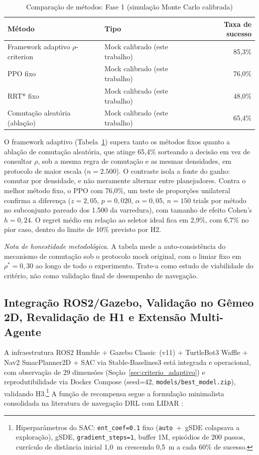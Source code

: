 \documentclass[12pt, a4paper]{article}
\begin{document}
\begin{table}[H]
  \centering
  \caption{Comparação de métodos: Fase 1 (simulação Monte Carlo calibrada)}
  \label{tab:fase1}
  \begin{tabular}{llr}
    \toprule
    \textbf{Método} & \textbf{Tipo} & \textbf{Taxa de sucesso} \\
    \midrule
    Framework adaptivo $\rho$-criterion & Mock calibrado (este trabalho) & 85,3\% \\
    PPO fixo                            & Mock calibrado (este trabalho) & 76,0\% \\
    RRT* fixo                           & Mock calibrado (este trabalho) & 48,0\% \\
    Comutação aleatória (ablação)       & Mock calibrado (este trabalho) & 65,4\% \\
    \bottomrule
  \end{tabular}
\end{table}

O framework adaptivo (Tabela~\ref{tab:fase1}) supera tanto os métodos fixos quanto a ablação de
comutação aleatória, que atinge 65,4\% sorteando a decisão em vez de consultar $\rho$, sob a
mesma regra de comutação e as mesmas densidades, em protocolo de maior escala ($n{=}2.500$). O
contraste isola a fonte do ganho: comutar por densidade, e não meramente alternar entre
planejadores. Contra o melhor método fixo, o PPO com 76,0\%, um teste de proporções unilateral
confirma a diferença ($z = 2{,}05$, $p = 0{,}020$, $\alpha = 0{,}05$, $n = 150$ trials por
método no subconjunto pareado dos 1.500 da varredura), com tamanho de efeito Cohen's
$h = 0{,}24$. O regret médio em relação ao seletor ideal fica em 2,9\%, com 6,7\% no pior caso,
dentro do limite de 10\% previsto por H2.

\textit{Nota de honestidade metodológica.} A tabela mede a auto-consistência do mecanismo de
comutação sob o protocolo mock original, com o limiar fixo em $\rho^*{=}0{,}30$ ao longo de todo
o experimento. Trate-a como estudo de viabilidade do critério, não como validação final de
desempenho de navegação.


\subsection{Integração ROS2/Gazebo, Validação no Gêmeo 2D, Revalidação de H1 e Extensão Multi-Agente}
\label{sec:integracao}

A infraestrutura ROS2 Humble + Gazebo Classic~(v11) + TurtleBot3 Waffle + Nav2 SmacPlanner2D +
SAC \cite{Haarnoja2018} via Stable-Baselines3 \cite{Raffin2021} está integrada e operacional, com
observação de 29 dimensões (Seção~\ref{sec:criterio_adaptivo}) e reprodutibilidade via Docker
Compose (seed=42, \texttt{models/best\_model.zip}), validando H3.\footnote{Hiperparâmetros do
SAC: \texttt{ent\_coef=0.1} fixo (\texttt{auto}~+~gSDE colapsava a exploração), gSDE,
\texttt{gradient\_steps=1}, buffer 1M, episódios de 200 passos, currículo de distância inicial
1,0~m crescendo 0,5~m a cada 60\% de sucesso.} A função de recompensa segue a formulação
minimalista consolidada na literatura de navegação DRL com LIDAR \cite{Cimurs2022, deJesus2021}:
\end{document}
